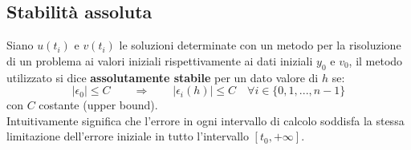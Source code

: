 \subsection{Stabilità assoluta}
Siano $u(t_i)$ e $v(t_i)$ le soluzioni determinate con un metodo per la risoluzione di un problema ai valori iniziali rispettivamente ai dati iniziali $y_0$ e $v_0$, il metodo utilizzato si dice \textbf{assolutamente stabile} per un dato valore di $h$ se:
\begin{equation*}
	|\epsilon_0| \leq C \qquad \Rightarrow \qquad |\epsilon_i(h)| \leq C \quad \forall i \in \{0,1,...,n-1\}
\end{equation*}
con $C$ costante (upper bound).
\\Intuitivamente significa che l'errore in ogni intervallo di calcolo soddisfa la stessa limitazione dell'errore iniziale in tutto l'intervallo $[t_0, +\infty]$.

